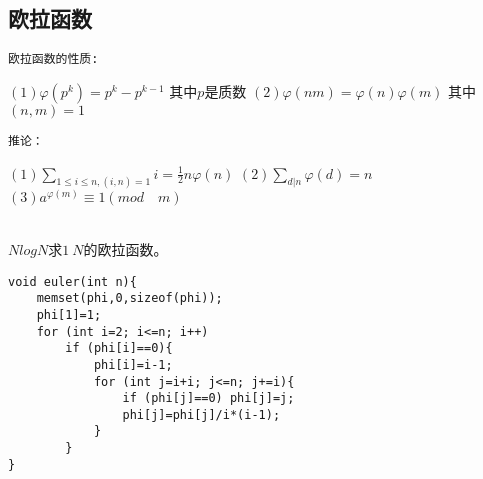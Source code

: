 \subsection{欧拉函数}
\begin{verbatim}
欧拉函数的性质: 
\end{verbatim}
$(1) \varphi(p^k)=p^k-p^{k-1}$ \quad 其中$p$是质数 \newline
$(2) \varphi(nm)=\varphi(n)\varphi(m)$ \quad 其中$(n,m)=1$
\begin{verbatim}
推论：
\end{verbatim}
$(1)\sum_{1\leq i \leq n,(i,n)=1}{i}=\frac{1}{2} n\varphi(n)$ \newline
$(2)\sum_{d|n}{\varphi(d)}=n$ \newline
$(3)a^{\varphi(m)}\equiv 1(mod \quad m)$

~\\
$NlogN$求$1~N$的欧拉函数。\par
\begin{verbatim}
void euler(int n){
    memset(phi,0,sizeof(phi));
    phi[1]=1;
    for (int i=2; i<=n; i++)
        if (phi[i]==0){
            phi[i]=i-1;
            for (int j=i+i; j<=n; j+=i){
                if (phi[j]==0) phi[j]=j;
                phi[j]=phi[j]/i*(i-1);
            }
        }
}

\end{verbatim}
